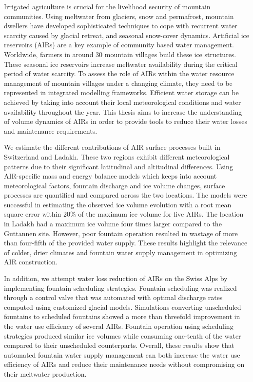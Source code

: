 \label{sec:summary}

Irrigated agriculture is crucial for the livelihood security of mountain communities. Using meltwater from
glaciers, snow and permafrost, mountain dwellers have developed sophisticated techniques to cope with recurrent
water scarcity caused by glacial retreat, and seasonal snow-cover dynamics. Artificial ice
reservoirs (AIRs) are a key example of community based water management. Worldwide, farmers in around 30 mountain
villages build these ice structures. These seasonal ice reservoirs increase meltwater availability during the
critical period of water scarcity. To assess the role of AIRs within the water resource management of
mountain villages under a changing climate, they need to be represented in integrated modelling frameworks.
Efficient water storage can be achieved by taking into account their local meteorological conditions and
water availability throughout the year. This thesis aims to increase the understanding of volume dynamics of
AIRs in order to provide tools to reduce their water losses and maintenance requirements.

We estimate the different contributions of AIR surface processes built in Switzerland and Ladakh. These two
regions exhibit different meteorological patterns due to their significant latitudinal and altitudinal
differences. Using AIR-specific mass and energy balance models which keeps into account meteorological factors,
fountain discharge and ice volume changes, surface processes are quantified and compared across the two
locations. The models were successful in estimating the observed ice volume evolution with a root mean square
error within 20\% of the maximum ice volume for five AIRs. The location in Ladakh had a maximum ice volume four
times larger compared to the Guttannen site. However, poor fountain operation resulted in wastage of more than
four-fifth of the provided water supply. These results highlight the relevance of colder, drier climates and
fountain water supply management in optimizing AIR construction.

In addition, we attempt water loss reduction of AIRs on the Swiss Alps by implementing fountain scheduling strategies.
Fountain scheduling was realized through a control valve that was automated with optimal discharge rates
computed using customized glacial models. Simulations converting unscheduled fountains to scheduled fountains
showed a more than threefold improvement in the water use efficiency of several AIRs. Fountain operation using
scheduling strategies produced similar ice volumes while consuming one-tenth of the water compared to their
unscheduled counterparts.  Overall, these results show that automated fountain water supply management can both
increase the water use efficiency of AIRs and reduce their maintenance needs without compromising on their
meltwater production.

